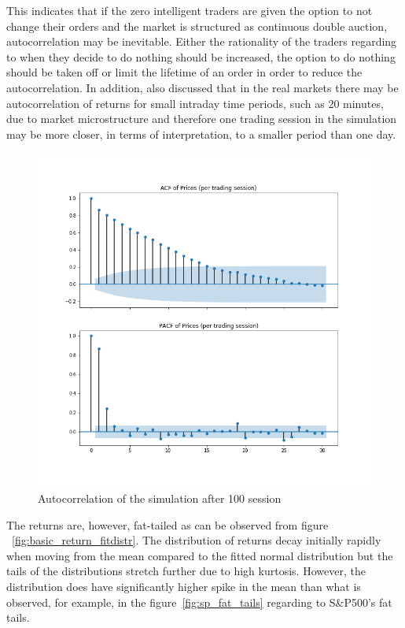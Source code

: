 This indicates that if the zero intelligent traders are given the option to not change their orders and
the market is structured as continuous double auction, autocorrelation may be inevitable. Either the
rationality of the traders regarding to when they decide to do nothing should be increased, the option
to do nothing should be taken off or limit the lifetime of an order in order to reduce the autocorrelation.
In addition, \citet{StylizedFacts01} also discussed that in the real markets there may be autocorrelation 
of returns for small intraday time periods, such as 20 minutes, due to market microstructure and therefore
one trading session in the simulation may be more closer, in terms of interpretation, to a smaller period 
than one day.

\begin{figure}
    \includegraphics[width=\linewidth]{plots/basic_autocorrelation.png}
    \caption{Autocorrelation of the simulation after 100 session}
    \label{fig:basic_autocorr}
\end{figure}

The returns are, however, fat-tailed as can be observed from figure 
~\ref{fig:basic_return_fitdistr}. The distribution of returns decay
initially rapidly when moving from the mean compared to the fitted
normal distribution but the tails of the distributions stretch
further due to high kurtosis. However, the distribution does have
significantly higher spike in the mean than what is observed, for 
example, in the figure~\ref{fig:sp_fat_tails} regarding to S\&P500's
fat tails. 


